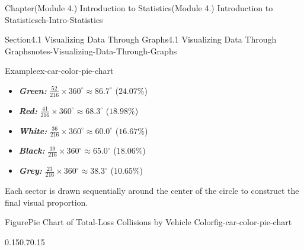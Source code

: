 \documentclass[oneside,10pt,]{book}
\newcommand{\ptxlistdisc}{\raisebox{0.3ex}{\textbullet}}
\newcommand{\alert}[1]{\textbf{\textit{#1}}}
\begin{document}
\begin{chapterptx}{Chapter}{(Module 4.) Introduction to Statistics}{}{(Module 4.) Introduction to Statistics}{}{}{ch-Intro-Statistics}
\begin{sectionptx}{Section}{4.1 Visualizing Data Through Graphs}{}{4.1 Visualizing Data Through Graphs}{}{}{notes-Visualizing-Data-Through-Graphs}
\begin{example}{Example}{}{ex-car-color-pie-chart}
\begin{itemize}[label=\ptxlistdisc]
\item{}\alert{Green:} \(\frac{52}{216} \times 360^{\circ} \approx 86.7^{\circ}\) (\(24.07\%\))%
\item{}\alert{Red:} \(\frac{41}{216} \times 360^{\circ} \approx 68.3^{\circ}\) (\(18.98\%\))%
\item{}\alert{White:} \(\frac{36}{216} \times 360^{\circ} \approx 60.0^{\circ}\) (\(16.67\%\))%
\item{}\alert{Black:} \(\frac{39}{216} \times 360^{\circ} \approx 65.0^{\circ}\) (\(18.06\%\))%
\item{}\alert{Grey:} \(\frac{23}{216} \times 360^{\circ} \approx 38.3^{\circ}\) (\(10.65\%\))%
\end{itemize}
%
\par
Each sector is drawn sequentially around the center of the circle to construct the final visual proportion.%
\begin{figureptx}{Figure}{Pie Chart of Total-Loss Collisions by Vehicle Color}{fig-car-color-pie-chart}{}%
\begin{image}{0.15}{0.7}{0.15}{}%
\end{image}
\end{figureptx}
\end{example}
\end{sectionptx}
\end{chapterptx}
\end{document}
